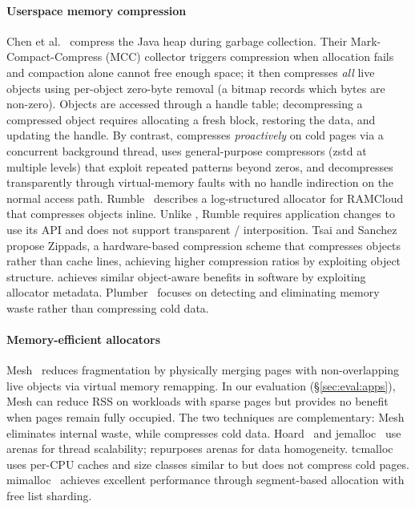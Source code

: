 \paragraph{Userspace memory compression}
Chen et al.~\cite{chen2003heap} compress the Java heap during garbage
collection.  Their Mark-Compact-Compress (MCC) collector triggers
compression when allocation fails and compaction alone
cannot free enough space; it then compresses \emph{all} live objects
using per-object zero-byte removal (a bitmap records which bytes are
non-zero).  Objects are accessed through a handle table; decompressing
a compressed object requires allocating a fresh block, restoring the
data, and updating the handle.  By contrast, \sys compresses
\emph{proactively} on cold pages via a concurrent background thread,
uses general-purpose compressors (zstd at multiple levels) that
exploit repeated patterns beyond zeros, and decompresses transparently through
virtual-memory faults with no handle indirection on the normal access
path.
Rumble~\cite{rumble2014log} describes a log-structured allocator for
RAMCloud that compresses objects inline.  Unlike \sys, Rumble requires
application changes to use its API and does not support transparent
/ interposition.
Tsai and Sanchez~\cite{tsai2019compress} propose Zippads, a hardware-based
compression scheme that compresses objects
rather than cache lines, achieving higher compression ratios by
exploiting object structure. \sys achieves similar
object-aware benefits in software by exploiting allocator metadata.
Plumber~\cite{ayers2019asmdb} focuses on detecting and eliminating
memory waste rather than compressing cold data.

\paragraph{Memory-efficient allocators}
Mesh~\cite{powers2019mesh} reduces fragmentation by physically
merging pages with non-overlapping live objects via virtual memory
remapping.  In our evaluation (\S\ref{sec:eval:apps}), Mesh
can reduce RSS on workloads with sparse pages but provides no benefit
when pages remain fully occupied.
The two techniques are complementary: Mesh eliminates internal
waste, while \sys compresses cold data.
Hoard~\cite{berger2000hoard} and
jemalloc~\cite{evans2015jemalloc} use arenas for thread
scalability; \sys repurposes arenas for data homogeneity.
tcmalloc~\cite{google2024tcmalloc} uses per-CPU caches and size
classes similar to \sys but does not compress cold pages.
mimalloc~\cite{leijen2019mimalloc} achieves excellent performance
through segment-based allocation with free list sharding.

